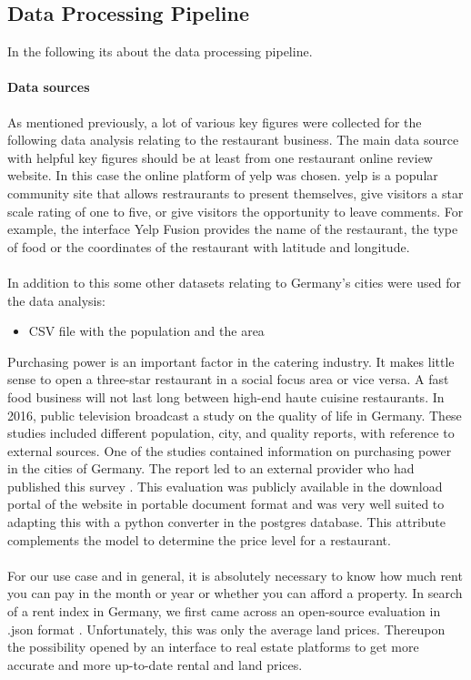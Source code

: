 \subsection{Data Processing Pipeline}
\label{subsec:pipeline}
In the following its about the data processing pipeline.

\paragraph{Data sources}
\label{subsec:Data sources}
As mentioned previously, a lot of various key figures were collected for the following data analysis relating to the restaurant business. The main data source with helpful key figures should be at least from one restaurant online review website. In this case the online platform of yelp was chosen. yelp is a popular community site that allows restraurants to present themselves, give visitors a star scale rating of one to five, or give visitors the opportunity to leave comments. For example, the interface Yelp Fusion provides the name of the restaurant, the type of food or the coordinates of the restaurant with latitude and longitude. \\
\\
In addition to this some other datasets relating to Germany's cities were used for the data analysis:
\begin{itemize}
\item CSV file with the population and the area
\end{itemize}

Purchasing power is an important factor in the catering industry. It makes little sense to open a three-star restaurant in a social focus area or vice versa. A fast food business will not last long between high-end haute cuisine restaurants. In 2016, public television broadcast a study on the quality of life in Germany. These studies included different population, city, and quality reports, with reference to external sources. One of the studies contained information on purchasing power in the cities of Germany. The report led to an external provider who had published this survey \cite{BuyingPower}. This evaluation was publicly available in the download portal of the website in portable document format and was very well suited to adapting this with a python converter in the postgres database. This attribute complements the model to determine the price level for a restaurant.\\
\\
For our use case and in general, it is absolutely necessary to know how much rent you can pay in the month or year or whether you can afford a property. In search of a rent index in Germany, we first came across an open-source evaluation in .json format \cite{Sparda}. Unfortunately, this was only the average land prices. Thereupon the possibility opened by an interface to real estate platforms \cite{ImmoScout} to get more accurate and more up-to-date rental and land prices.
\\
